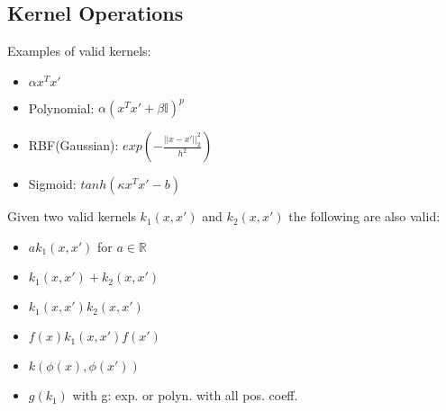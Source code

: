 \subsection{Kernel Operations}

Examples of valid kernels:
\begin{itemize}
    \item $\alpha x^Tx'$
    \item Polynomial: $\alpha(x^Tx' + \beta\mathbb{I})^p$
    \item RBF(Gaussian): $exp(-\frac{||x-x'||^2_2}{h^2})$
    \item Sigmoid: $tanh(\kappa x^Tx' - b)$
\end{itemize}

Given two valid kernels $k_1(x,x')$ and $k_2(x,x')$ the following are also valid:

\begin{itemize}
    \item $ak_1(x,x')$ for $a\in\mathbb{R}$
    \item $k_1(x,x') + k_2(x,x')$
    \item $k_1(x,x')k_2(x,x')$
    \item $f(x)k_1(x,x')f(x')$
    \item $k(\phi(x),\phi(x'))$
    \item $g(k_1)$ with g: exp. or polyn. with all pos. coeff.
\end{itemize}